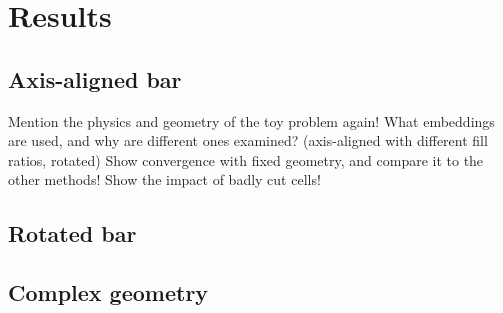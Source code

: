 %
\section{Results}
\label{section:results}
%

%
\subsection{Axis-aligned bar}
\label{section:axis_aligned_bar}
%

Mention the physics and geometry of the toy problem again!
What embeddings are used, and why are different ones examined? (axis-aligned with different fill ratios, rotated)
Show convergence with fixed geometry, and compare it to the other methods!
Show the impact of badly cut cells!

%
\subsection{Rotated bar}
\label{section:rotated_bar}
%

%
\subsection{Complex geometry}
\label{section:complex_geometry}
%
